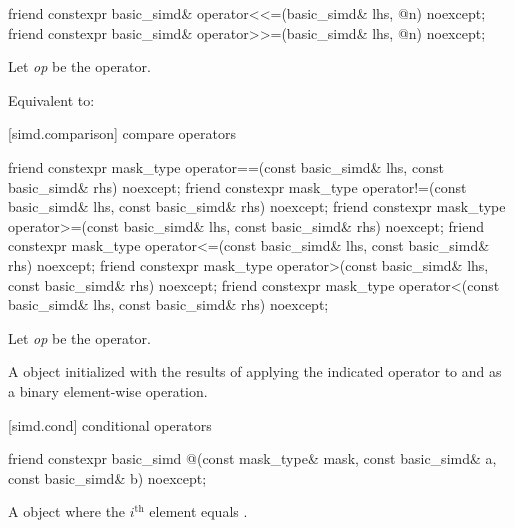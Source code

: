 \begin{itemdecl}
friend constexpr basic_simd& operator<<=(basic_simd& lhs, @\simdsizetype@ n) noexcept;
friend constexpr basic_simd& operator>>=(basic_simd& lhs, @\simdsizetype@ n) noexcept;
\end{itemdecl}

\begin{itemdescr}
  \pnum Let \textit{op} be the operator.

  \pnum\ConstraintOperatorTWellFormed

  \pnum\effects
  Equivalent to: 
\end{itemdescr}

[simd.comparison]{ compare operators}

\begin{itemdecl}
friend constexpr mask_type operator==(const basic_simd& lhs, const basic_simd& rhs) noexcept;
friend constexpr mask_type operator!=(const basic_simd& lhs, const basic_simd& rhs) noexcept;
friend constexpr mask_type operator>=(const basic_simd& lhs, const basic_simd& rhs) noexcept;
friend constexpr mask_type operator<=(const basic_simd& lhs, const basic_simd& rhs) noexcept;
friend constexpr mask_type operator>(const basic_simd& lhs, const basic_simd& rhs) noexcept;
friend constexpr mask_type operator<(const basic_simd& lhs, const basic_simd& rhs) noexcept;
\end{itemdecl}

\begin{itemdescr}
  \pnum Let \textit{op} be the operator.

  \pnum\ConstraintOperatorTWellFormed

  \pnum\returns
  A  object initialized with the results of applying the indicated operator to  and  as a binary element-wise operation.
\end{itemdescr}

[simd.cond]{ conditional operators}

\begin{itemdecl}
friend constexpr basic_simd
@\simdselect@(const mask_type& mask, const basic_simd& a, const basic_simd& b) noexcept;
\end{itemdecl}

\begin{itemdescr}
  \pnum\returns
  A  object where the $i^\text{th}$ element equals  \foralli.
\end{itemdescr}

